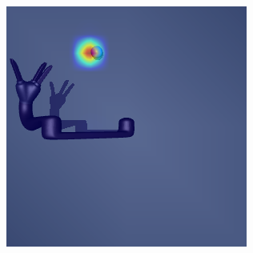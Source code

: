 \begin{figure}
\begin{subfigure}{0.24\columnwidth}
  \end{subfigure}
  \begin{subfigure}{0.24\columnwidth}
    \includegraphics[width=\linewidth]{figures/chapter6/distractor_saliency_jaco_pro_on/standard_sensor_std}
  \end{subfigure}
  

\end{figure}
